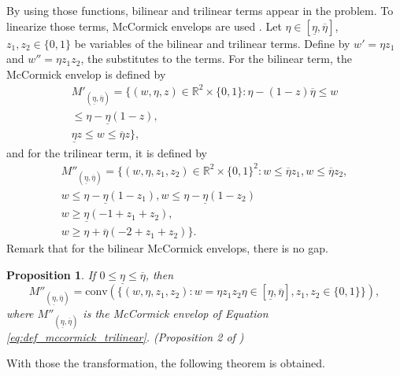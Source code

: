 \documentclass[12pt, letterpaper]{article}
\newcommand{\R}{\mathbb{R}}
\newtheorem{proposition}{Proposition}
\begin{document}
	By using those functions, bilinear and trilinear terms appear in the problem. To linearize those terms, McCormick envelops are used \cite{mccormick_computability_1976}. Let $\eta \in [\underline{\eta}, \overline{\eta}]$, $z_1, z_2 \in \{0, 1\}$ be variables of the bilinear and trilinear terms. Define by $w' = \eta z_1$ and $w'' = \eta z_1 z_2$, the substitutes to the terms. For the bilinear term, the McCormick envelop is defined by
	\begin{equation} \label{eq:def_mccormick_bilinear}
		\begin{split}
			M'_{(\underline{\eta}, \overline{\eta})} = \Big\{(w, \eta, z) \in \R^2 \times \{0, 1\}: \eta - (1 - z) \overline{\eta} \le w \\
			\le \eta - \underline{\eta} (1 - z), \\
			\underline{\eta}z \le w \le \overline{\eta} z\Big\},
		\end{split}
	\end{equation}
	and for the trilinear term, it is defined by
	\begin{equation} \label{eq:def_mccormick_trilinear}
		\begin{split}
			M''_{(\underline{\eta}, \overline{\eta})} = \Big\{(w, \eta, z_1, z_2) \in \R^2 \times \{0, 1\}^2: w \le \overline{\eta}z_1, w \le \overline{\eta}z_2, \\
			w \le \eta - \underline{\eta} (1 - z_1), w \le \eta - \underline{\eta} (1 - z_2) \\
			w \ge \underline{\eta} (-1 + z_1 + z_2), \\
			w \ge \eta + \overline{\eta} (-2 + z_1 + z_2)\Big\}.
		\end{split}
	\end{equation}
	Remark that for the bilinear McCormick envelops, there is no gap.
	\begin{proposition}
		If $0 \le \underline{\eta} \le \overline{\eta}$, then
		\begin{equation*}
			M''_{(\underline{\eta}, \overline{\eta})} = \mathrm{conv}\left(\{(w, \eta, z_1, z_2) : w = \eta z_1 z_2 \eta \in [\underline{\eta}, \overline{\eta}], z_1, z_2 \in \{0, 1\}\}\right),
		\end{equation*}
		where $M''_{(\underline{\eta}, \overline{\eta})}$ is the McCormick envelop of Equation \eqref{eq:def_mccormick_trilinear}. (Proposition 2 of \cite{basciftci_distributionally_2021})
	\end{proposition}
	With those the transformation, the following theorem is obtained.
	
\end{document}
